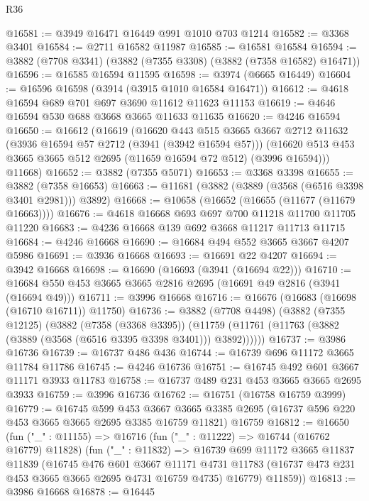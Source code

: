 \begin{lexlean}{R36}
\begin{coremodule}
@16581 := @3949 @16471 @16449 @991 @1010 @703 @1214
@16582 := @3368 @3401
@16584 := @2711 @16582 @11987
@16585 := @16581 @16584
@16594 := @3882 (@7708 @3341) (@3882 (@7355 @3308) (@3882 (@7358 @16582) @16471))
@16596 := @16585 @16594 @11595
@16598 := @3974 (@6665 @16449)
@16604 := @16596 @16598 (@3914 (@3915 @1010 @16584 @16471))
@16612 := @4618 @16594 @689 @701 @697 @3690 @11612 @11623 @11153
@16619 := @4646 @16594 @530 @688 @3668 @3665 @11633 @11635
@16620 := @4246 @16594
@16650 := @16612
    (@16619
      (@16620
        @443
        @515
        @3665
        @3667
        @2712
        @11632
        (@3936 @16594 @57 @2712 (@3941 (@3942 @16594 @57)))
        (@16620 @513 @453 @3665 @3665 @512 @2695 (@11659 @16594 @72 @512) (@3996 @16594)))
      @11668)
@16652 := @3882 (@7355 @5071)
@16653 := @3368 @3398
@16655 := @3882 (@7358 @16653)
@16663 := @11681 (@3882 (@3889 (@3568 (@6516 @3398 @3401 @2981))) @3892)
@16668 := @10658 (@16652 (@16655 (@11677 (@11679 @16663))))
@16676 := @4618 @16668 @693 @697 @700 @11218 @11700 @11705 @11220
@16683 := @4236 @16668 @139 @692 @3668 @11217 @11713 @11715
@16684 := @4246 @16668
@16690 := @16684 @494 @552 @3665 @3667 @4207 @5986
@16691 := @3936 @16668
@16693 := @16691 @22 @4207
@16694 := @3942 @16668
@16698 := @16690 (@16693 (@3941 (@16694 @22)))
@16710 := @16684 @550 @453 @3665 @3665 @2816 @2695 (@16691 @49 @2816 (@3941 (@16694 @49)))
@16711 := @3996 @16668
@16716 := @16676 (@16683 (@16698 (@16710 @16711)) @11750)
@16736 := @3882
    (@7708 @4498)
    (@3882
      (@7355 @12125)
      (@3882
        (@7358 (@3368 @3395))
        (@11759 (@11761 (@11763 (@3882 (@3889 (@3568 (@6516 @3395 @3398 @3401))) @3892))))))
@16737 := @3986 @16736
@16739 := @16737 @486 @436
@16744 := @16739 @696 @11172 @3665 @11784 @11786
@16745 := @4246 @16736
@16751 := @16745 @492 @601 @3667 @11171 @3933 @11783
@16758 := @16737 @489 @231 @453 @3665 @3665 @2695 @3933
@16759 := @3996 @16736
@16762 := @16751 (@16758 @16759 @3999)
@16779 := @16745
    @599
    @453
    @3667
    @3665
    @3385
    @2695
    (@16737 @596 @220 @453 @3665 @3665 @2695 @3385 @16759 @11821)
    @16759
@16812 := @16650
    (fun ("_" : @11155) =>
    @16716
      (fun ("_" : @11222) => @16744 (@16762 @16779) @11828)
      (fun ("_" : @11832) =>
      @16739
        @699
        @11172
        @3665
        @11837
        @11839
        (@16745
          @476
          @601
          @3667
          @11171
          @4731
          @11783
          (@16737 @473 @231 @453 @3665 @3665 @2695 @4731 @16759 @4735)
          @16779)
        @11859))
@16813 := @3986 @16668
@16878 := @16445

\end{coremodule}
\end{lexlean}
